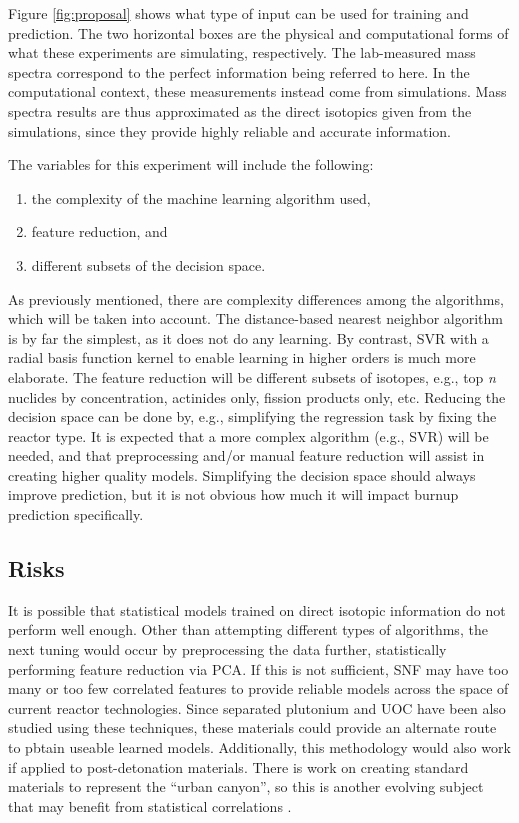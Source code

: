 Figure \ref{fig:proposal} shows what type of input can be used for training and
prediction.  The two horizontal boxes are the physical and computational forms
of what these experiments are simulating, respectively. The lab-measured mass
spectra correspond to the perfect information being referred to here. In the
computational context, these measurements instead come from simulations. Mass
spectra results are thus approximated as the direct isotopics given from the
simulations, since they provide highly reliable and accurate information.

The variables for this experiment will include the following:
\begin{enumerate}
  \itemsep-0.75em
  \item the complexity of the machine learning algorithm used, 
  \item feature reduction, and 
  \item different subsets of the decision space.
\end{enumerate}

As previously mentioned, there are complexity differences among the algorithms,
which will be taken into account.  The distance-based nearest neighbor
algorithm is by far the simplest, as it does not do any learning. By contrast,
\gls{SVR} with a radial basis function kernel to enable learning in higher
orders is much more elaborate.  The feature reduction will be different subsets
of isotopes, e.g., top \textit{n} nuclides by concentration, actinides only,
fission products only, etc.  Reducing the decision space can be done by, e.g.,
simplifying the regression task by fixing the reactor type. It is expected that
a more complex algorithm (e.g., \gls{SVR}) will be needed, and that
preprocessing and/or manual feature reduction will assist in creating higher
quality models.  Simplifying the decision space should always improve
prediction, but it is not obvious how much it will impact burnup prediction
specifically.

\subsection*{Risks}

It is possible that statistical models trained on direct isotopic information
do not perform well enough.  Other than attempting different types of
algorithms, the next tuning would occur by preprocessing the data further,
statistically performing feature reduction via \gls{PCA}. If this is not
sufficient, \gls{SNF} may have too many or too few correlated features to
provide reliable models across the space of current reactor technologies. Since
separated plutonium and \gls{UOC} have been also studied using these
techniques, these materials could provide an alternate route to pbtain useable
learned models. Additionally, this methodology would also work if applied to
post-detonation materials. There is work on creating standard materials to
represent the ``urban canyon'', so this is another evolving subject that may
benefit from statistical correlations \cite{refmaterial}.

